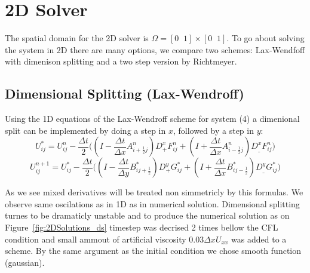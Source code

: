 
\section{2D Solver}
The spatial domain for the 2D solver is $\Omega=[0\;\;1]\times[0\;\;1]$. To go about solving the system in 2D there are many options,
we compare two schemes: Lax-Wendfoff with dimenison splitting and a two step version by Richtmeyer. \newline

\subsection{Dimensional Splitting (Lax-Wendroff)}

Using the 1D equations of the Lax-Wendroff scheme for system (4) a dimenional split can be implemented by 
doing a step in $x$, followed by a step in $y$: 
\begin{equation}\label{eqn:6}
U_{ij}^* = U_{ij}^n - \frac{\Delta t}{2} 
\bigg(( I- \frac{\Delta t}{\Delta x} A_{i+\frac{1}{2}j}^n ) D_+^xF_{ij}^n 
+ (I+ \frac{\Delta t}{\Delta x} A_{i-\frac{1}{2}j}^n) D_{\_}^xF_{ij}^n\bigg)
\end{equation}
\begin{equation}\label{eqn:7}
U_{ij}^{n+1} = U_{ij}^* - 
\frac{\Delta t}{2} \bigg((I - \frac{\Delta t}{\Delta y} B_{ij+\frac{1}{2}}^*) D_+^yG_{ij}^*
 +(I + \frac{\Delta t}{\Delta x} B_{ij-\frac{1}{2}}^*) D_{\_}^y G_{ij}^* \bigg)
\end{equation}

As we see mixed derivatives will be treated non simmetricly by this formulas. We observe same oscilations as in 1D as in numerical solution.
Dimensional splitting turnes to be dramaticly unstable and to produce the numerical solution as on Figure~\ref{fig:2DSolutions_ds} timestep was decrised
2 times bellow the CFL condition and small ammout of artificial viscosity $0.03 \Delta x U_{xx}$ was added to a scheme. By the same argument as the initial condition
we chose smooth function (gaussian). 

